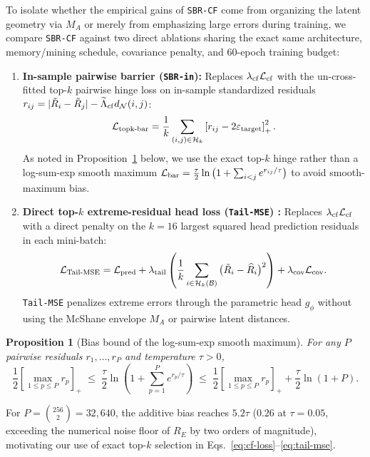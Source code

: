 \documentclass[preprint,11pt,a4paper]{elsarticle}
\newtheorem{proposition}{Proposition}
\newcommand{\relu}[1]{\left[#1\right]_{+}}
\begin{document}
To isolate whether the empirical gains of \texttt{SBR-CF} come from organizing the latent geometry via $M_A$ or merely from emphasizing large errors during training, we compare \texttt{SBR-CF} against two direct ablations sharing the exact same architecture, memory/mining schedule, covariance penalty, and 60-epoch training budget:
\begin{enumerate}
    \item \textbf{In-sample pairwise barrier (\texttt{SBR-in}):} Replaces $\lambda_{\rm cf}\mathcal L_{\rm cf}$ with the un-cross-fitted top-$k$ pairwise hinge loss on in-sample standardized residuals $r_{ij}=|\tilde R_i-\tilde R_j|-\widetilde\Lambda_{\rm cf}d_{\mathcal N}(i,j)$:
    \begin{equation}
    \mathcal L_{\rm topk\text{-}bar}
    = \frac1k\sum_{(i,j)\in\mathcal H_k}\relu{r_{ij}-2\varepsilon_{\rm target}}^2.
    \end{equation}
    As noted in Proposition~\ref{prop:lse} below, we use the exact top-$k$ hinge rather than a log-sum-exp smooth maximum $\mathcal L_{\rm bar}=\frac{\tau}{2}\ln\big(1+\sum_{i<j}e^{r_{ij}/\tau}\big)$ to avoid smooth-maximum bias.
    \item \textbf{Direct top-$k$ extreme-residual head loss (\texttt{Tail-MSE}) \cite{Fan2017TopK}:} Replaces $\lambda_{\rm cf}\mathcal L_{\rm cf}$ with a direct penalty on the $k=16$ largest squared head prediction residuals in each mini-batch:
    \begin{equation}
    \mathcal L_{\rm Tail\text{-}MSE}
    = \mathcal L_{\rm pred}
    + \lambda_{\rm tail}\left(\frac1k\sum_{i\in\mathcal H_k(\mathcal B)}\big(\tilde R_i-\widehat R_i\big)^2\right)
    + \lambda_{\rm cov}\mathcal L_{\rm cov}.
    \label{eq:tail-mse}
    \end{equation}
    \texttt{Tail-MSE} penalizes extreme errors through the parametric head $g_\phi$ without using the McShane envelope $M_A$ or pairwise latent distances.
\end{enumerate}

\begin{proposition}[Bias bound of the log-sum-exp smooth maximum]
\label{prop:lse}
For any $P$ pairwise residuals $r_1,\dots,r_P$ and temperature $\tau>0$,
\begin{equation}
\frac12\relu{\max_{1\le p\le P} r_p}
\;\le\;
\frac{\tau}{2}\ln\!\left(1+\sum_{p=1}^P e^{r_p/\tau}\right)
\;\le\;
\frac12\relu{\max_{1\le p\le P} r_p} + \frac{\tau}{2}\ln(1+P).
\end{equation}
\end{proposition}
For $P=\binom{256}{2}=32{,}640$, the additive bias reaches $5.2\tau$ ($0.26$ at $\tau=0.05$, exceeding the numerical noise floor of $R_E$ by two orders of magnitude), motivating our use of exact top-$k$ selection in Eqs.~\eqref{eq:cf-loss}--\eqref{eq:tail-mse}.
\end{document}

